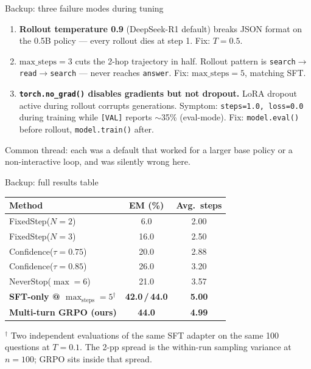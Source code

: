 \documentclass[aspectratio=169]{beamer}
\begin{document}
\begin{frame}{Backup: three failure modes during tuning}
\small
\begin{enumerate}
  \item \textbf{Rollout temperature 0.9} (DeepSeek-R1 default) breaks
  JSON format on the 0.5B policy --- every rollout dies at step 1.
  Fix: $T{=}0.5$.
  \item \textbf{$\mathrm{max\_steps}{=}3$} cuts the 2-hop trajectory
  in half. Rollout pattern is
  \texttt{search}$\to$\texttt{read}$\to$\texttt{search} --- never
  reaches \texttt{answer}. Fix: $\mathrm{max\_steps}{=}5$, matching
  SFT.
  \item \textbf{\texttt{torch.no\_grad()} disables gradients but not
  dropout.} LoRA dropout active during rollout corrupts generations.
  Symptom: \texttt{steps=1.0, loss=0.0} during training while
  \texttt{[VAL]} reports $\sim$35\% (eval-mode). Fix:
  \texttt{model.eval()} before rollout, \texttt{model.train()}
  after.
\end{enumerate}

\vspace{0.5em}

Common thread: each was a default that worked for a larger base
policy or a non-interactive loop, and was silently wrong here.
\end{frame}

\begin{frame}{Backup: full results table}
\centering
\small
\begin{tabular}{lcc}
\toprule
Method & EM (\%) & Avg.\ steps \\
\midrule
FixedStep($N{=}2$)        & 6.0  & 2.00 \\
FixedStep($N{=}3$)        & 16.0 & 2.50 \\
Confidence($\tau{=}0.75$) & 20.0 & 2.88 \\
Confidence($\tau{=}0.85$) & 26.0 & 3.20 \\
NeverStop($\max{=}6$)     & 21.0 & 3.57 \\
\midrule
\textbf{SFT-only @ $\max_{\text{steps}}{=}5$}$^{\dagger}$ & \textbf{42.0\,/\,44.0} & \textbf{5.00} \\
\textbf{Multi-turn GRPO (ours)}                         & \textbf{44.0}          & \textbf{4.99} \\
\bottomrule
\end{tabular}

\vspace{0.5em}
{\footnotesize $^{\dagger}$ Two independent evaluations of the same
SFT adapter on the same 100 questions at $T{=}0.1$. The 2-pp
spread is the within-run sampling variance at $n{=}100$; GRPO
sits inside that spread.}
\end{frame}
\end{document}
